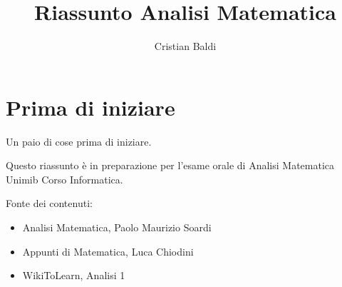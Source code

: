 \documentclass[a4paper,12pt]{book}
\title{Riassunto Analisi Matematica}
\author{Cristian Baldi}
\begin{document}
\maketitle

\tableofcontents

\chapter{Prima di iniziare}

Un paio di cose prima di iniziare.

Questo riassunto è in preparazione per l'esame orale di Analisi Matematica Unimib Corso Informatica.

Fonte dei contenuti:
\begin{itemize}
\item Analisi Matematica, Paolo Maurizio Soardi
\item Appunti di Matematica, Luca Chiodini
\item WikiToLearn, Analisi 1
\end{itemize}







\end{document}
